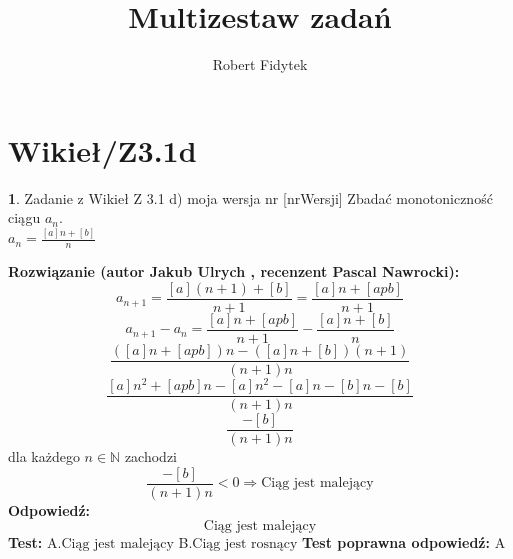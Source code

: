 \documentclass[12pt, a4paper]{article}
\title{Multizestaw zadań}
\author{Robert Fidytek}
\date{}
\theoremstyle{definition} %
\newtheorem{zad}{}
\newcommand{\kategoria}[1]{\section{#1}} %
\newcommand{\zadStart}[1]{\begin{zad}#1\newline} %
\newcommand{\zadStop}{\end{zad}}   %
\newcommand{\rozwStart}[2]{\noindent \textbf{Rozwiązanie (autor #1 , recenzent #2): }\newline} %
\newcommand{\rozwStop}{\newline}                                            %
\newcommand{\odpStart}{\noindent \textbf{Odpowiedź:}\newline}    %
\newcommand{\odpStop}{\newline}                                             %
\newcommand{\testStart}{\noindent \textbf{Test:}\newline} %
\newcommand{\testStop}{\newline} %
\newcommand{\kluczStart}{\noindent \textbf{Test poprawna odpowiedź:}\newline} %
\newcommand{\kluczStop}{\newline} %
\begin{document}
\maketitle


\kategoria{Wikieł/Z3.1d}
\zadStart{Zadanie z Wikieł Z 3.1 d) moja wersja nr [nrWersji]}
Zbadać monotoniczność ciągu $a_{n}$.\\ $a_{n}=\frac{[a]n+[b]}{n}$
\zadStop
\rozwStart{Jakub Ulrych}{Pascal Nawrocki}
$$a_{n+1}=\frac{[a](n+1)+[b]}{n+1}=\frac{[a]n+[apb]}{n+1}$$
$$a_{n+1}-a_{n}=\frac{[a]n+[apb]}{n+1}-\frac{[a]n+[b]}{n}$$
$$\frac{([a]n+[apb])n-([a]n+[b])(n+1)}{(n+1)n}$$
$$\frac{[a]n^{2}+[apb]n-[a]n^{2}-[a]n-[b]n-[b]}{(n+1)n}$$
$$\frac{-[b]}{(n+1)n}$$
dla każdego $n\in\mathbb{N}$ zachodzi
$$\frac{-[b]}{(n+1)n}<0\Rightarrow \text{Ciąg jest malejący}$$
\rozwStop
\odpStart
$$\text{Ciąg jest malejący}$$
\odpStop
\testStart
A.$\text{Ciąg jest malejący}$
B.$\text{Ciąg jest rosnący}$
\testStop
\kluczStart
A
\kluczStop
\end{document}
